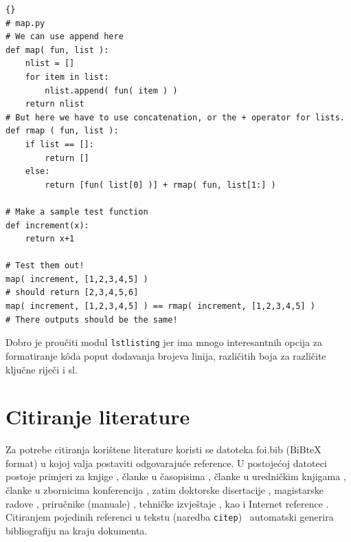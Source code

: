 \documentclass[a4paper,12pt]{foi}
\begin{document}
\lstset{commentstyle=\textit,language=python}
\begin{lstlisting}[frame=tb]{}
# map.py
# We can use append here
def map( fun, list ):
    nlist = []
    for item in list:
        nlist.append( fun( item ) )
    return nlist
# But here we have to use concatenation, or the + operator for lists.
def rmap ( fun, list ):
    if list == []:
        return []
    else:
        return [fun( list[0] )] + rmap( fun, list[1:] )

# Make a sample test function
def increment(x):
    return x+1

# Test them out!
map( increment, [1,2,3,4,5] )
# should return [2,3,4,5,6]
map( increment, [1,2,3,4,5] ) == rmap( increment, [1,2,3,4,5] )
# There outputs should be the same!

\end{lstlisting}

Dobro je proučiti modul \texttt{lstlisting} jer ima mnogo interesantnih opcija za formatiranje k\^{o}da poput dodavanja brojeva linija, različitih boja za različite ključne riječi i sl.

\chapter{Citiranje literature}

Za potrebe citiranja kori\v{s}tene literature koristi se datoteka foi.bib (BiBteX format) u kojoj valja postaviti odgovaraju\'{c}e reference. U postoje\'{c}oj datoteci postoje primjeri za knjige \citep{Baral2004, Jennex2007, JohsansenSwigart2000, PogacnikBloom1998}, \v{c}lanke u \v{c}asopisima \citep{BacaEtAl2007, Jurin2006}, \v{c}lanke u uredni\v{c}kim knjigama \citep{Garzarelli2004, Luhmann2003}, \v{c}lanke u zbornicima konferencija \citep{AbeleBischoff2001, BacaEtAl2006}, zatim doktorske disertacije \citep{Bahr2009}, magistarske radove \citep{Schatten2008}, priru\v{c}nike (manuale) \citep{HAZU2004}, tehni\v{c}ke izvje\v{s}taje \citep{BlonkEtAll1998}, kao i Internet reference \citep{Berger2006, Pilgrim2006}. Citiranjem pojedinih referenci u tekstu (naredba \texttt{citep}) \LaTeXe\ automatski generira bibliografiju na kraju dokumenta.


\end{document}
